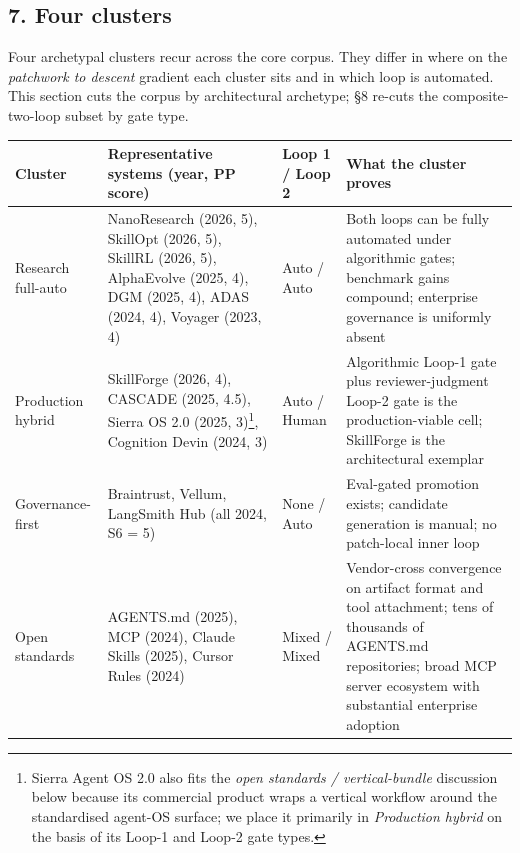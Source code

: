 \subsection{7. Four clusters}\label{four-clusters}

Four archetypal clusters recur across the core corpus. They differ in
where on the \emph{patchwork to descent} gradient each cluster sits and
in which loop is automated. This section cuts the corpus by architectural
archetype; §8 re-cuts the composite-two-loop subset by gate type.

{\def\LTcaptype{none} %
\begin{longtable}[]{@{}
  >{\raggedright\arraybackslash}p{}
  >{\raggedright\arraybackslash}p{}
  >{\raggedright\arraybackslash}p{}
  >{\raggedright\arraybackslash}p{}@{}}
\toprule\noalign{}
\begin{minipage}[b]{\linewidth}\raggedright
Cluster
\end{minipage} & \begin{minipage}[b]{\linewidth}\raggedright
Representative systems (year, PP score)
\end{minipage} & \begin{minipage}[b]{\linewidth}\raggedright
Loop 1 / Loop 2
\end{minipage} & \begin{minipage}[b]{\linewidth}\raggedright
What the cluster proves
\end{minipage} \\
\midrule\noalign{}
\endhead
\bottomrule\noalign{}
\endlastfoot
Research full-auto & NanoResearch (2026, 5), SkillOpt (2026, 5), SkillRL
(2026, 5), AlphaEvolve (2025, 4), DGM (2025, 4), ADAS (2024, 4), Voyager
(2023, 4) & Auto / Auto & Both loops can be fully automated under
algorithmic gates; benchmark gains compound; enterprise governance is
uniformly absent \\
Production hybrid & SkillForge (2026, 4), CASCADE (2025, 4.5), Sierra OS
2.0 (2025, 3)\footnote{Sierra Agent OS 2.0 also fits the \emph{open
  standards / vertical-bundle} discussion below because its commercial
  product wraps a vertical workflow around the standardised agent-OS
  surface; we place it primarily in \emph{Production hybrid} on the
  basis of its Loop-1 and Loop-2 gate types.}, Cognition Devin (2024, 3)
& Auto / Human & Algorithmic Loop-1 gate plus reviewer-judgment Loop-2
gate is the production-viable cell; SkillForge is the architectural
exemplar \\
Governance-first & Braintrust, Vellum, LangSmith Hub (all 2024, S6 = 5)
& None / Auto & Eval-gated promotion exists; candidate generation is
manual; no patch-local inner loop \\
Open standards & AGENTS.md (2025), MCP (2024), Claude Skills (2025),
Cursor Rules (2024) & Mixed / Mixed & Vendor-cross convergence on
artifact format and tool attachment; tens of thousands of AGENTS.md
repositories; broad MCP server ecosystem with substantial enterprise
adoption \\
\end{longtable}
}

